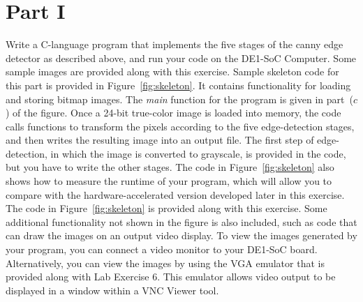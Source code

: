 \documentclass[epsfig,10pt,fullpage]{article}
\begin{document}
\section*{Part I}

Write a C-language program that implements the five stages of the canny edge detector as described
above, and run your code on the DE1-SoC Computer. Some sample images are provided along
with this exercise. Sample skeleton code for this part is provided in Figure~\ref{fig:skeleton}. 
It contains functionality for loading and storing bitmap images. The {\it main} function for 
the program is given in part~($c$) of the figure. Once a 24-bit true-color image is loaded 
into memory, the code calls functions to transform the pixels according to the five 
edge-detection stages, and then writes the resulting image into an output file. The first 
step of edge-detection, in which the image is converted to grayscale, is provided in the code,
but you have to write the other stages.  The code in Figure~\ref{fig:skeleton} also 
shows how to measure the runtime of your program, which will allow you to compare with the 
hardware-accelerated version developed later in this exercise. The code in 
Figure~\ref{fig:skeleton} is provided along with this exercise. Some additional functionality not
shown in the figure is also included, such as code that can draw the images on an
output video display.  To view the images generated by your program, you can connect
a video monitor to your DE1-SoC board. Alternatively, you can view the images by using the
VGA emulator that is provided along with Lab Exercise 6. This emulator allows video output
to be displayed in a window within a VNC Viewer tool.
\end{document}
